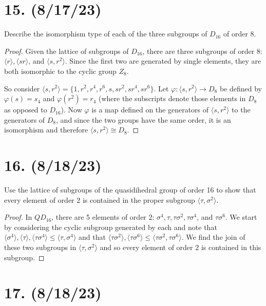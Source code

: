 \documentclass{article}
\begin{document}
\section*{15. (8/17/23)}

Describe the isomorphism type of each of the three subgroups of $D_{16}$ of order 8.

\begin{proof}
    Given the lattice of subgroups of $D_{16}$, there are three subgroups of order 8: $\langle r \rangle, \langle sr \rangle$, and $\langle s, r^2 \rangle$. Since the first two are generated by single elements, they are both isomorphic to the cyclic group $Z_8$.

    So consider $\langle s, r^2 \rangle = \{ 1, r^2, r^4, r^6, s, sr^2, sr^4, sr^6 \}$. Let $\varphi: \langle s, r^2 \rangle \rightarrow D_8$ be defined by $\varphi(s) = s_4$ and $\varphi(r^2) = r_4$ (where the subscripts denote those elements in $D_8$ as opposed to $D_{16}$). Now $\varphi$ is a map defined on the generators of $\langle s, r^2 \rangle$ to the generators of $D_8$, and since the two groups have the same order, it is an isomorphism and therefore $\langle s, r^2 \rangle \cong D_8$.
\end{proof}

\section*{16. (8/18/23)}

Use the lattice of subgroups of the quasidihedral group of order 16 to show that every element of order 2 is contained in the proper subgroup $\langle \tau, \sigma^2 \rangle$.

\begin{proof}
    In $QD_{16}$, there are 5 elements of order 2: $\sigma^4, \tau, \tau \sigma^2, \tau \sigma^4$, and $\tau \sigma^6$. We start by considering the cyclic subgroup generated by each and note that $\langle \sigma^4 \rangle, \langle \tau \rangle, \langle \tau \sigma^4 \rangle \leq \langle \tau, \sigma^4 \rangle$ and that $\langle \tau \sigma^2 \rangle, \langle \tau \sigma^6 \rangle \leq \langle \tau \sigma^2, \tau \sigma^6 \rangle$. We find the join of these two subgroups in $\langle \tau, \sigma^2 \rangle$ and so every element of order 2 is contained in this subgroup.
\end{proof}

\section*{17. (8/18/23)}
\end{document}

